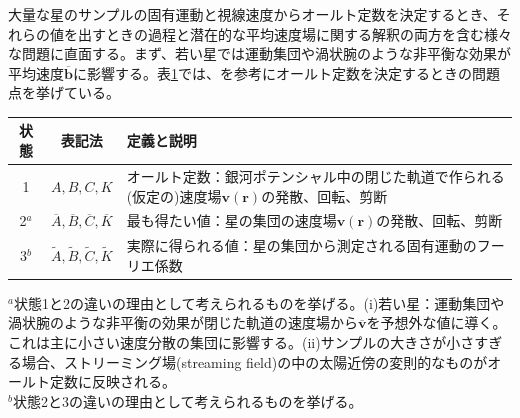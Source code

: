 大量な星のサンプルの固有運動と視線速度からオールト定数を決定するとき、それらの値を出すときの過程と潜在的な平均速度場に関する解釈の両方を含む様々な問題に直面する。まず、若い星では運動集団や渦状腕のような非平衡な効果が平均速度$\overline{\pmb{b}}$に影響する。表\ref{table1}では、\cite{OD03}を参考にオールト定数を決定するときの問題点を挙げている。
\begin{table}[htb]
\centering
{\small
  \begin{tabular}{c|c|p{10cm}} \hline
    状態 & 表記法 & 定義と説明\\ \hline
    1 & $A,B,C,K$ & オールト定数：銀河ポテンシャル中の閉じた軌道で作られる(仮定の)速度場$\pmb{v}(\pmb{r})$の発散、回転、剪断\\
    2$^a$ & $\overline{A},\overline{B},\overline{C},\overline{K}$ & 最も得たい値：星の集団の速度場$\pmb{v}(\pmb{r})$の発散、回転、剪断\\
    3$^b$ & $\widetilde{A},\widetilde{B},\widetilde{C},\widetilde{K}$ & 実際に得られる値：星の集団から測定される固有運動のフーリエ係数\\
    \hline
  \end{tabular} \label{table1}
\vskip 3pt
\begin{minipage}{13cm}
\textit{$^a$}状態1と2の違いの理由として考えられるものを挙げる。(i)若い星：運動集団や渦状腕のような非平衡の効果が閉じた軌道の速度場から$\pmb{\overline{v}}$を予想外な値に導く。これは主に小さい速度分散の集団に影響する。(ii)サンプルの大きさが小さすぎる場合、ストリーミング場(streaming field)の中の太陽近傍の変則的なものがオールト定数に反映される。 \\
\textit{$^b$}状態2と3の違いの理由として考えられるものを挙げる。
\end{minipage}
}
\end{table}

